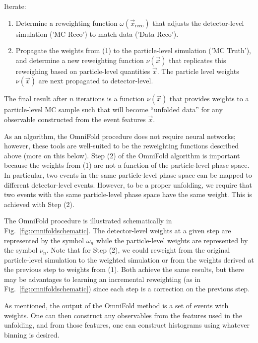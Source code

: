 \begin{description}
\item Iterate:
  \begin{enumerate}[label={(\arabic*)}]
    \item Determine a reweighting function $\omega(\vec{x}_\mathrm{reco})$ that adjusts the detector-level simulation ('MC Reco') to match data ('Data Reco').
    \item Propagate the weights from (1) to the particle-level simulation ('MC Truth'), and determine a new reweighting function $\nu(\vec{x})$ that replicates this reweighing based on particle-level quantities $\vec{x}$. The particle level weights $\nu(\vec{x})$ are next propagated to detector-level.
 \end{enumerate}
\end{description}
%
The final result after $n$ iterations is a function $\nu(\vec{x})$ that provides weights to a particle-level MC sample such that will become ``unfolded data'' for any observable constructed from the event features $\vec{x}$.

As an algorithm, the OmniFold procedure does not require neural networks; however, these tools are well-suited to be the reweighting functions described above (more on this below).  Step (2) of the OmniFold algorithm is important because the weights from (1) are not a function of the particle-level phase space.  In particular, two events in the same particle-level phase space can be mapped to different detector-level events.  However, to be a proper unfolding, we require that two events with the same particle-level phase space have the same weight.  This is achieved with Step (2).

The OmniFold procedure is illustrated schematically in Fig.~\ref{fig:omnifoldschematic}.  The detector-level weights at a given step are represented by the symbol $\omega_n$ while the particle-level weights are represented by the symbol $\nu_n$.  Note that for Step (2), we could reweight from the original particle-level simulation to the weighted simulation or from the weights derived at the previous step to weights from (1).  Both achieve the same results, but there may be advantages to learning an incremental reweighting (as in Fig.~\ref{fig:omnifoldschematic}) since each step is a correction on the previous step.

As mentioned, the output of the OmniFold method is a set of events with weights.  One can then construct any observables from the features used in the unfolding, and from those features, one can construct histograms using whatever binning is desired.

